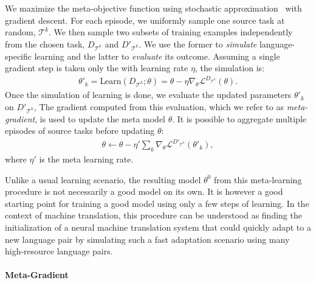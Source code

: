 We maximize the meta-objective function using stochastic approximation~\citep{robbins1951stochastic} with gradient descent. For each episode, we uniformly sample one source task at random, $\mathcal{T}^{k}$. %
We then sample two subsets of training examples independently from the chosen task, $D_{\mathcal{T}^{k}}$ and $D'_{\mathcal{T}^{k}}$. We use the former to {\it simulate} language-specific learning and the latter to {\it evaluate} its outcome. 
Assuming a single gradient step is taken only the with learning rate $\eta$,
the simulation is:
\begin{align*}
    \theta'_k = \text{Learn}(D_{\mathcal{T}^k}; \theta) =
    \theta - \eta \nabla_{\theta} \mathcal{L}^{D_{\mathcal{T}^k}}(\theta).
\end{align*}
Once the simulation of learning is done, we evaluate the updated parameters $\theta'_k$ on $D'_{\mathcal{T}^{k}}$, %
The gradient computed from this evaluation, which we refer to as {\it meta-gradient}, is used to update the meta model $\theta$. It is possible to aggregate multiple episodes of source tasks before updating $\theta$:
\begin{align*}
    \theta \leftarrow \theta - \eta' \sum_k \nabla_\theta \mathcal{L}^{D'_{\mathcal{T}^{k}}}(\theta'_k),
\end{align*}
where $\eta'$ is the meta learning rate. 

Unlike a usual learning scenario, the resulting model $\theta^0$ from this meta-learning procedure is not necessarily a good model on its own. It is however a good starting point for training a good model using only a few steps of learning. In the context of machine translation, this procedure can be understood as finding the initialization of a neural machine translation system that could quickly adapt to a new language pair by simulating such a fast adaptation scenario using many high-resource language pairs. 



\paragraph{Meta-Gradient}

